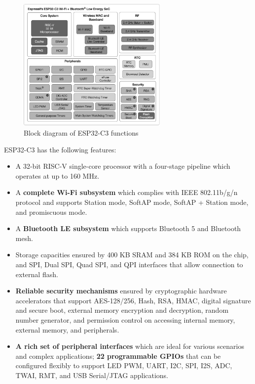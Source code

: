\documentclass[a4paper,12pt,openany]{book}
\begin{document}
\begin{figure}[h!]
    \centering
    \includegraphics[width=0.65\textwidth]{D5Z/5-4}
    \caption{Block diagram of ESP32-C3 functions}
\end{figure}

ESP32-C3 has the following features:

\begin{itemize}
    \item A 32-bit RISC-V single-core processor with a four-stage pipeline which operates at up to 160 MHz.
    \item A \textbf{complete Wi-Fi subsystem} which complies with IEEE 802.11b/g/n protocol and supports Station mode, SoftAP mode, SoftAP + Station mode, and promiscuous mode.
    \item A \textbf{Bluetooth LE subsystem} which supports Bluetooth 5 and Bluetooth mesh.
    \item Storage capacities ensured by 400 KB SRAM and 384 KB ROM on the chip, and SPI, Dual SPI, Quad SPI, and QPI interfaces that allow connection to external flash.
    \item \textbf{Reliable security mechanisms} ensured by cryptographic hardware accelerators that support AES-128/256, Hash, RSA, HMAC, digital signature and secure boot, external memory encryption and decryption, random number generator, and permission control on accessing internal memory, external memory, and peripherals.
    \item \textbf{A rich set of peripheral interfaces} which are ideal for various scenarios and complex applications; \textbf{22 programmable GPIOs} that can be configured flexibly to support LED PWM, UART, I2C, SPI, I2S, ADC, TWAI, RMT, and USB Serial/JTAG applications.
\end{itemize}
\end{document}
